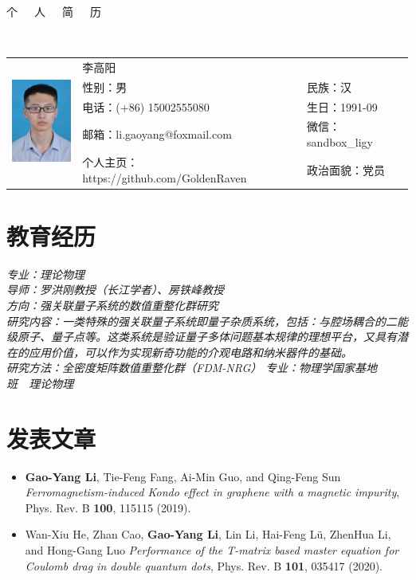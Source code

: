 \documentclass{resume}
\begin{document}

\begin{center}
\Huge{个~~~人~~~简~~~历}
\end{center}
\\
\Large{
  \begin{tabu}{ c l l }
    &
   \scshape{李高阳} &  \\
    & 性别：男 & 民族：汉 \\
    & 电话：(+86) 15002555080 & 生日：1991-09 \\
    & 邮箱：li.gaoyang@foxmail.com & 微信：sandbox\_ligy\\
    & 个人主页：https://github.com/GoldenRaven & 政治面貌：党员
  \end{tabu}
}

\section{教育经历}
\textit{专业：理论物理}\\
\textit{导师：罗洪刚教授（长江学者）、房铁峰教授}\\
\textit{方向：强关联量子系统的数值重整化群研究}\\
\textit{研究内容：一类特殊的强关联量子系统即量子杂质系统，包括：与腔场耦合的二能级原子、量子点等。这类系统是验证量子多体问题基本规律的理想平台，又具有潜在的应用价值，可以作为实现新奇功能的介观电路和纳米器件的基础。}\\
\textit{研究方法：全密度矩阵数值重整化群（FDM-NRG）}
\textit{专业：物理学国家基地班\ \ 理论物理}

\section{发表文章}
\begin{itemize}
\item \textbf{Gao-Yang Li}, Tie-Feng Fang, Ai-Min Guo, and Qing-Feng Sun \textit{Ferromagnetism-induced Kondo effect in graphene with a magnetic impurity}, Phys. Rev. B \textbf{100}, 115115 (2019).
\item Wan-Xiu He, Zhan Cao, \textbf{Gao-Yang Li}, Lin Li, Hai-Feng Lü, ZhenHua Li, and Hong-Gang Luo \textit{Performance of the T-matrix based master equation for Coulomb drag in double quantum dots}, Phys. Rev. B \textbf{101}, 035417 (2020).
\end{itemize}
\end{document}
